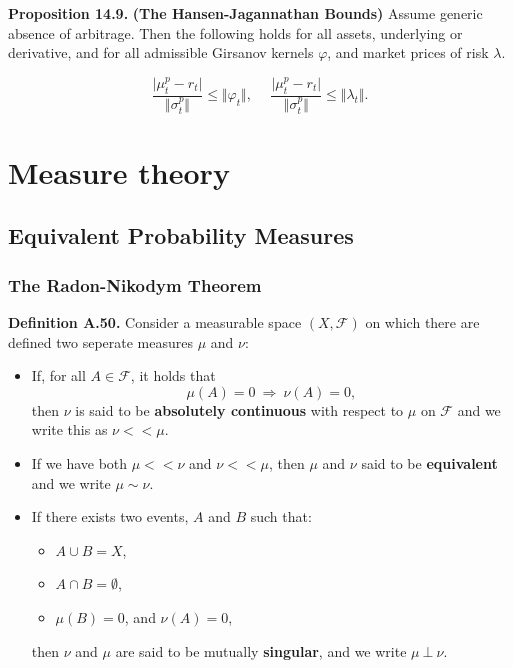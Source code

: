 \documentclass[
]{article}
\providecommand{\tightlist}{%
  \setlength{\itemsep}{0pt}\setlength{\parskip}{0pt}}
\begin{document}
\textbf{Proposition 14.9.} \textbf{(The Hansen-Jagannathan Bounds)}
Assume generic absence of arbitrage. Then the following holds for all
assets, underlying or derivative, and for all admissible Girsanov
kernels \(\varphi\), and market prices of risk \(\lambda\).

\[
\frac{\vert \mu_t^p - r_t\vert}{\Vert \sigma_t ^p\Vert}\le \Vert \varphi_t\Vert,\hspace{15pt} \frac{\vert \mu_t^p - r_t\vert}{\Vert \sigma_t ^p\Vert}\le \Vert \lambda_t\Vert.
\]

\hypertarget{measure-theory}{%
\section{Measure theory}\label{measure-theory}}

\hypertarget{equivalent-probability-measures}{%
\subsection{Equivalent Probability
Measures}\label{equivalent-probability-measures}}

\hypertarget{the-radon-nikodym-theorem}{%
\subsubsection{The Radon-Nikodym
Theorem}\label{the-radon-nikodym-theorem}}

\textbf{Definition A.50.} Consider a measurable space
\((X,\mathcal{F})\) on which there are defined two seperate measures
\(\mu\) and \(\nu\):

\begin{itemize}
\item
  If, for all \(A\in \mathcal{F}\), it holds that \[
    \mu(A)=0\ \Rightarrow\ \nu(A)=0,
    \] then \(\nu\) is said to be \textbf{absolutely continuous} with
  respect to \(\mu\) on \(\mathcal{F}\) and we write this as
  \(\nu < < \mu\).
\item
  If we have both \(\mu << \nu\) and \(\nu << \mu\), then \(\mu\) and
  \(\nu\) said to be \textbf{equivalent} and we write \(\mu\sim \nu\).
\item
  If there exists two events, \(A\) and \(B\) such that:

  \begin{itemize}
  \tightlist
  \item
    \(A\cup B=X\),
  \item
    \(A\cap B=\emptyset\),
  \item
    \(\mu(B)=0\), and \(\nu(A)=0\),
  \end{itemize}

  then \(\nu\) and \(\mu\) are said to be mutually \textbf{singular},
  and we write \(\mu\ \bot\ \nu\).
\end{itemize}
\end{document}
